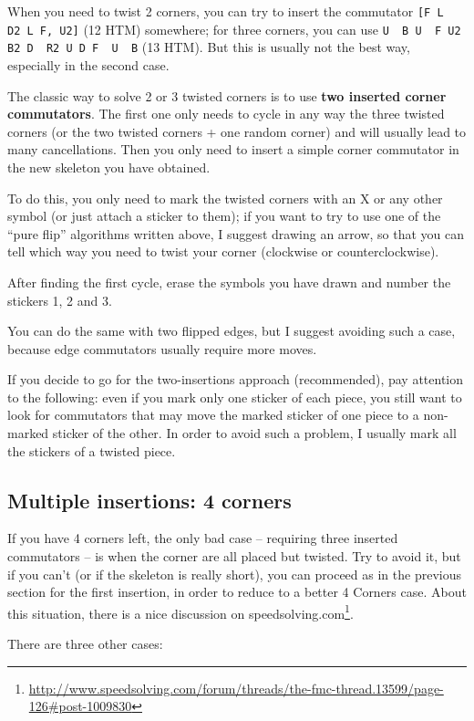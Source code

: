 \documentclass[11pt,a4paper]{book}
\newcommand{\p}{\textquotesingle}
\newcommand{\m}{\texttt}
\newcommand{\ps}{\p\,\,}
\begin{document}
When you need to twist 2 corners, you can try to insert the commutator \m{[F L\ps D2 L F\p, U2]} (12 HTM) somewhere; for three corners, you can use \m{U\ps B U\ps F U2 B2 D\ps R2 U D F\ps U\ps B} (13 HTM). But this is usually not the best way, especially in the second case.

The classic way to solve 2 or 3 twisted corners is to use \textbf{two inserted corner commutators}. The first one only needs to cycle in any way the three twisted corners (or the two twisted corners + one random corner) and will usually lead to many cancellations. Then you only need to insert a simple corner commutator in the new skeleton you have obtained.

To do this, you only need to mark the twisted corners with an X or any other symbol (or just attach a sticker to them); if you want to try to use one of the “pure flip” algorithms written above, I suggest drawing an arrow, so that you can tell which way you need to twist your corner (clockwise or counterclockwise).

After finding the first cycle, erase the symbols you have drawn and number the stickers 1, 2 and 3.

You can do the same with two flipped edges, but I suggest avoiding such a case, because edge commutators usually require more moves.

If you decide to go for the two-insertions approach (recommended), pay attention to the following: even if you mark only one sticker of each piece, you still want to look for commutators that may move the marked sticker of one piece to a non-marked sticker of the other. In order to avoid such a problem, I usually mark all the stickers of a twisted piece.

\subsection{Multiple insertions: 4 corners}

If you have 4 corners left, the only bad case -- requiring three inserted commutators -- is when the corner are all placed but twisted. Try to avoid it, but if you can't (or if the skeleton is really short), you can proceed as in the previous section for the first insertion, in order to reduce to a better 4 Corners case. About this situation, there is a nice discussion on speedsolving.com\footnote{\url{http://www.speedsolving.com/forum/threads/the-fmc-thread.13599/page-126\#post-1009830}}.

There are three other cases:
\end{document}
